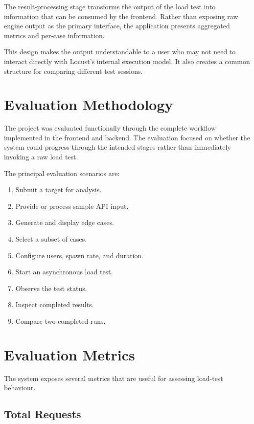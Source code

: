 \documentclass{tietreport}
\begin{document}
The result-processing stage transforms the output of the load test into information that can be consumed by the frontend. Rather than exposing raw engine output as the primary interface, the application presents aggregated metrics and per-case information.

This design makes the output understandable to a user who may not need to interact directly with Locust's internal execution model. It also creates a common structure for comparing different test sessions.

\section{Evaluation Methodology}

The project was evaluated functionally through the complete workflow implemented in the frontend and backend. The evaluation focused on whether the system could progress through the intended stages rather than immediately invoking a raw load test.

The principal evaluation scenarios are:

\begin{enumerate}
    \item Submit a target for analysis.
    \item Provide or process sample API input.
    \item Generate and display edge cases.
    \item Select a subset of cases.
    \item Configure users, spawn rate, and duration.
    \item Start an asynchronous load test.
    \item Observe the test status.
    \item Inspect completed results.
    \item Compare two completed runs.
\end{enumerate}

\section{Evaluation Metrics}

The system exposes several metrics that are useful for assessing load-test behaviour.

\subsection{Total Requests}
\end{document}
